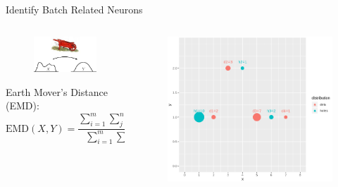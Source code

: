 \documentclass{beamer}
\begin{document}
\begin{frame}{Identify Batch Related Neurons}
  \begin{columns}
    \begin{column}[t]{.48\textwidth}
      \begin{figure}[ht]
        \centering
        \includegraphics[width=1.0\textwidth]{figures/earth-mover-distance.jpeg}
        \caption*{\label{fig:emd}}
      \end{figure}
      \vspace{-1cm}
      Earth Mover's Distance (EMD):
      \[
        \text{EMD}(X,Y)  = \frac{\sum_{i=1}^{m} \sum_{j=1}^{n} f_{i, j} d_{i, j}}{\sum_{i=1}^{m} \sum_{j=1}^{n} f_{i, j}}
      \]
    \end{column}
    \begin{column}[t]{.48\textwidth}
      \vspace{-1cm}
      \begin{figure}[ht]
        \centering
        \includegraphics[width=1.0\textwidth,height=0.4\textheight]{figures/earth_points2.png}

\end{figure}
\end{column}
\end{columns}
\end{frame}
\end{document}
